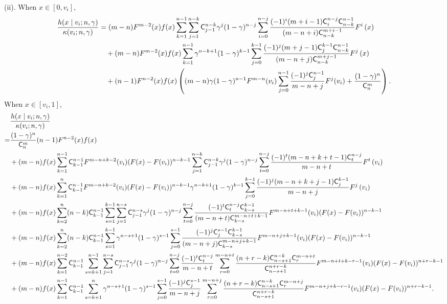 \begin{lemma}
{{\begin{align*}
\end{align*}}
}
(ii). When $x \in [0,v_i]$,
 \begin{align*}
 \frac{h(x\mid v_i;n,\gamma)}{\kappa(v_i;n,\gamma)} &= (m-n)F^{m-2}(x)f(x)\sum_{k=1}^{n-1}  \sum_{j=1}^{n-k}\mathsf{C}^{n-k}_{j-1}\gamma^j
 (1-\gamma)^{n-j}\sum_{i=0}^{n-j}\frac{(-1)^{i}(m+i-1)\mathsf{C}^{n-j}_i\mathsf{C}^{n-1}_{n-k}}{(m-n+i)\mathsf{C}^{m+i-1}_{n-k}}F^i\left(x\right)\\
 & \quad + (m-n)F^{m-2}(x)f(x)\sum_{k=1}^{n-1} \gamma^{n-k+1}
 (1-\gamma)^{k-1}\sum_{j=0}^{k-1}\frac{(-1)^{j}(m+j-1)\mathsf{C}^{k-1}_j\mathsf{C}^{n-1}_{n-k}}{(m-n+j)\mathsf{C}^{m+j-1}_{n-k}}F^{j}\left(x\right) \\
 &\quad + (n-1)F^{n-2}(x)f(x)\left((m-n)\gamma(1-\gamma)^{n-1}F^{m-n}(v_i)\sum_{j=0}^{n-1}\frac{(-1)^j\mathsf{C}^{n-1}_j}{m-n+j}F^j(v_i) + \frac{(1-\gamma)^n}{\mathsf{C}^m_n}\right). 
 \end{align*}
When $x \in [v_i, 1]$, 
{\tiny {
\begin{align*}
&\frac{h(x\mid v_i;n,\gamma)}{\kappa(v_i;n,\gamma)}\\
=& \frac{(1-\gamma)^n}{\mathsf{C}^m_n}(n-1)F^{n-2}(x)f(x)\\
&+ (m-n)f(x)\sum_{k=1}^{n-1}\mathsf{C}^{n-1}_{k-1} F^{m-n+k-2}(v_i)(F(x) - F(v_i))^{n-k-1}\sum_{j=1}^{n-k} \mathsf{C}^{n-k}_{j-1}\gamma^j
 (1-\gamma)^{n-j}\sum_{t=0}^{n-j}\frac{(-1)^{t}(m-n+k+t-1)\mathsf{C}^{n-j}_t}{m-n+t}F^{t}\left(v_{i}\right)\\
 & + (m-n)f(x)\sum_{k=1}^{n}\mathsf{C}^{n-1}_{k-1} F^{m-n+k-2}(v_i)(F(x) - F(v_i))^{n-k-1}\gamma^{n-k+1}
 (1-\gamma)^{k-1}\sum_{j=0}^{k-1}\frac{(-1)^{j}(m-n+k+j-1)\mathsf{C}^{k-1}_j}{m-n+j}F^{j}\left(v_{i}\right)\\
 & + (m-n) f(x)\sum_{k=2}^{n}(n-k)\mathsf{C}^{n-1}_{k-1}\sum_{s=1}^{k-1}\sum_{j=1}^{n-s} \mathsf{C}^{n-s}_{j-1}\gamma^j
 (1-\gamma)^{n-j}\sum_{t=0}^{n-j}\frac{(-1)^{t}\mathsf{C}^{n-j}_t\mathsf{C}^{k-1}_{k-s}}{(m-n+t)\mathsf{C}^{m-n+t+k-1}_{k-s}}F^{m-n+t+k-1}(v_i)(F(x) - F(v_i))^{n-k-1}\\
 & + (m-n)f(x)\sum_{k=2}^{n} (n-k)\mathsf{C}^{n-1}_{k-1}\sum_{s=1}^{k-1}\gamma^{n-s+1}
 (1-\gamma)^{s-1}\sum_{j=0}^{s-1}\frac{(-1)^{j}\mathsf{C}^{s-1}_j\mathsf{C}^{k-1}_{k-s}}{(m-n+j)\mathsf{C}^{m-n+j+k-1}_{k-s}}F^{m-n+j+k-1}(v_i)(F(x) - F(v_i))^{n-k-1}\\
 & + (m-n)f(x)\sum_{k=1}^{n-2}\mathsf{C}^{n-1}_{k-1} \sum_{s=k+1}^{n-1}\sum_{j=1}^{n-s} \mathsf{C}^{n-s}_{j-1}\gamma^j
 (1-\gamma)^{n-j}\sum_{t=0}^{n-j}\frac{(-1)^{t}\mathsf{C}^{n-j}_t}{m-n+t}\sum_{r=0}^{m-n+t}\frac{(n+r-k)\mathsf{C}^{n-k}_{n-s+1}\mathsf{C}^{m-n+t}_r}{\mathsf{C}^{n+r-k}_{n-s+1}}F^{m-n+t+k-r-1}(v_i)(F(x) - F(v_i))^{n+r-k-1}\\
 & + (m-n)f(x)\sum_{k=1}^{n-1} \mathsf{C}^{n-1}_{k-1}\sum_{s=k+1}^{n}\gamma^{n-s+1}
 (1-\gamma)^{s-1}\sum_{j=0}^{s-1}\frac{(-1)^{j}\mathsf{C}^{s-1}_j}{m-n+j}\sum_{r=0}^{m-n+j}\frac{(n+r-k)\mathsf{C}^{n-k}_{n-s+1}\mathsf{C}^{m-n+j}_r}{\mathsf{C}^{n+r-k}_{n-s+1}}F^{m-n+j+k-r-1}(v_i)(F(x) - F(v_i))^{n+r-k-1}.
\end{align*}}
} 
\end{lemma}

